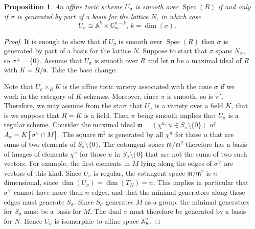 \documentclass[10pt,a4paper]{book}
\newcommand{\jarek}[1]{\todo[color=green!40]{JB: #1}}             %
\newtheorem*{prop*}{Proposition}
\newcommand{\on}{\operatorname}
\DeclareMathOperator{\Spec}{Spec}
\newcommand{\mf}{\mathfrak}
\begin{document}
\begin{prop*} An affine toric scheme $U_\sigma$ is smooth over $\Spec (R)$ if and only if $\sigma$ is generated by part of a basis for the lattice $N$, in which case
\[
U_\sigma \cong \mathbb{A}^k\times \mathbb{G}_m^{n-k} \text{, } k =\on{dim}(\sigma).
\]
\end{prop*}
\begin{proof}
It is enough to show that if $U_\sigma$ is smooth over $\Spec (R)$ then $\sigma$ is generated by part of a basis for the lattice $N$. Suppose to start that $\sigma$ spans $N_\mathbb{R}$, so $\sigma^\perp = \{0\}$. Assume that $U_\sigma$ is smooth over $R$ and let $\mf{n}$ be a maximal ideal of $R$ with $K=R/\mf{n}$. Take the base change:
\begin{center}
\end{center}
Note that $U_\sigma \times_R K$ is the affine toric variety associated with the cone $\sigma$ if we work in the category of $K$-schemes. Moreover, since $\pi$ is smooth, so is $\pi'$\jarek{referencja?}. Therefore, we may assume from the start that $U_\sigma$ is a variety over a field $K$, that is we suppose that $R=K$ is a field. Then $\pi$ being smooth implies that $U_\sigma$ is a regular scheme\jarek{referencja?}. Consider the maximal ideal $\mf{m} = (\chi^u:u\in S_\sigma\setminus \{0\})$ of $A_\sigma = K[\sigma^\vee\cap M]$. The square $\mf{m}^2$ is generated by all $\chi^u$ for those $u$ that are sums of two elements of $S_\sigma\setminus \{0\}$. The cotangent space $\mf{m}/\mf{m}^2$ therefore has a basis of images of elements $\chi^u$ for
those $u$ in $S_\sigma \setminus \{0\}$ that are not the sums of two such vectors. For
example, the first elements in $M$ lying along the edges of $\sigma^\vee$ are vectors of this kind. Since $U_\sigma$ is regular, 
the cotangent space $\mf{m}/\mf{m}^2$ is $n$-dimensional, since $\dim(U_\sigma) = \dim(T_N) = n$. This implies in particular that $\sigma^\vee$ cannot have more than $n$ edges, and that the
minimal generators along these edges must generate $S_\sigma$. Since $S_\sigma$ generates $M$ as a group, the minimal generators for $S_\sigma$ must be a basis for $M$. The dual $\sigma$ must therefore be generated by a basis for $N$. Hence $U_\sigma$ is isomorphic to affine space $\mathbb{A}^n_K$.


\end{proof}
\end{document}
